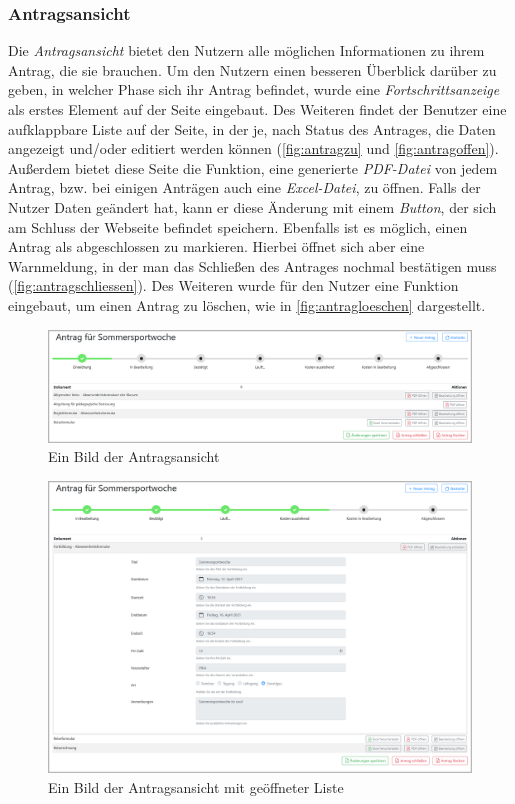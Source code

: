 \subsubsection{Antragsansicht}
\label{chapter:implementierung-frontend-komponenten-antragsansicht}
Die \textit{Antragsansicht} bietet den Nutzern alle möglichen Informationen zu ihrem Antrag, die sie brauchen. Um den Nutzern einen besseren Überblick darüber zu geben, in welcher Phase sich ihr Antrag befindet, wurde eine \textit{Fortschrittsanzeige} als erstes Element auf der Seite eingebaut. Des Weiteren findet der Benutzer eine aufklappbare Liste auf der Seite, in der je, nach Status des Antrages, die Daten angezeigt und/oder editiert werden können (\autoref{fig:antragzu} und \autoref{fig:antragoffen}). Außerdem bietet diese Seite die Funktion, eine generierte \textit{PDF-Datei} von jedem Antrag, bzw. bei einigen Anträgen auch eine \textit{Excel-Datei}, zu öffnen. Falls der Nutzer Daten geändert hat, kann er diese Änderung mit einem \textit{Button}, der sich am Schluss der Webseite befindet speichern. Ebenfalls ist es möglich, einen Antrag als abgeschlossen zu markieren. Hierbei öffnet sich aber eine Warnmeldung, in der man das Schließen des Antrages nochmal bestätigen muss (\autoref{fig:antragschliessen}). Des Weiteren wurde für den Nutzer eine Funktion eingebaut, um einen Antrag zu löschen, wie in \autoref{fig:antragloeschen} dargestellt.
\begin{figure}[H]
	\centering
	\includegraphics[width=1\linewidth]{images/ldehner_implementierung/antrag_zu}
	\caption[Antragsansicht]{Ein Bild der Antragsansicht}
	\label{fig:antragzu}
\end{figure}
\begin{figure}[H]
	\centering
	\includegraphics[width=1\linewidth]{images/ldehner_implementierung/antrag}
	\caption[Antragsansicht geöffnet]{Ein Bild der Antragsansicht mit geöffneter Liste}
	\label{fig:antragoffen}
\end{figure}
